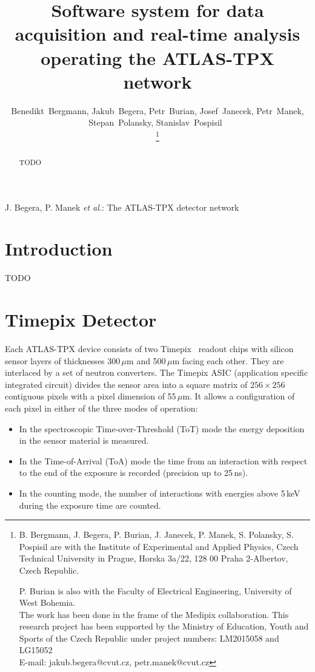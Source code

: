 \documentclass[journal]{IEEEtran}
\begin{document}
\title{Software system for data acquisition and real-time analysis operating the ATLAS-TPX network}

\author{Benedikt~Bergmann, Jakub~Begera, Petr~Burian, Josef~Janecek, Petr~Manek, Stepan~Polansky, Stanislav~Pospisil~

\thanks{B. Bergmann, J. Begera, P. Burian, J. Janecek, P. Manek, S. Polansky, S. Pospisil are with the Institute of Experimental and Applied Physics, Czech Technical University in Prague, Horska 3a/22, 128 00 Praha 2-Albertov, Czech Republic.

P. Burian is also with the Faculty of Electrical Engineering, University of West Bohemia.\protect\\
The work has been done in the frame of the Medipix collaboration. This research project has been supported by the Ministry of Education, Youth and Sports of the Czech Republic under project numbers: LM2015058 and LG15052\protect\\
E-mail: jakub.begera@cvut.cz, petr.manek@cvut.cz}
}

\markboth{}%
{J. Begera, P. Manek \MakeLowercase{\textit{et al.}}: The ATLAS-TPX detector network}


\maketitle


\begin{abstract} 
TODO
\end{abstract}

\section{\label{sec:introduction}Introduction}
TODO

\section{\label{sec:device}Timepix Detector}
Each ATLAS-TPX device consists of two Timepix~\cite{Llopart2007} readout chips with silicon sensor layers of thicknesses 300\,$\mu$m and 500\,$\mu$m facing each other. They are interlaced by a set of neutron converters. The Timepix ASIC (application specific integrated circuit) divides the sensor area into a square matrix of $256 \times 256$ contiguous pixels with a pixel dimension of 55\,$\mu$m. It allows a configuration of each pixel in either of the three modes of operation: 
\begin{itemize}
\item In the spectroscopic Time-over-Threshold (ToT) mode the energy deposition in the sensor material is measured.
\item In the Time-of-Arrival (ToA) mode the time from an interaction with respect to the end of the exposure is recorded (precision up to 25\,ns).
\item In the counting mode, the number of interactions with energies above 5\,keV during the exposure time are counted.
\end{itemize}
\end{document}
